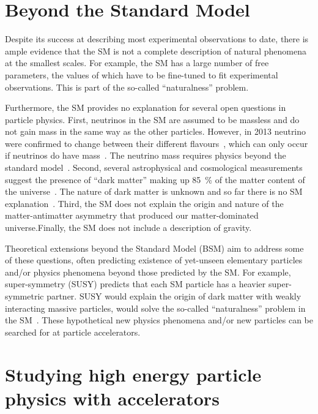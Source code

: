\section{Beyond the Standard Model}

Despite its success at describing most experimental observations to date, there is ample evidence that the SM is not a complete description of natural phenomena at the smallest scales. For example, the SM has a large number of free parameters, the values of which have to be fine-tuned to fit experimental observations. This is part of the so-called ``naturalness'' problem.

Furthermore, the SM provides no explanation for several open questions in particle physics. First, neutrinos in the SM are assumed to be massless and do not gain mass in the same way as the other particles. However, in 2013 neutrino were confirmed to change between their different flavours~\cite{aharmim_combined_2013}, which can only occur if neutrinos do have mass~\cite{pontecorvo_neutrino_1967}. The neutrino mass requires physics beyond the standard model~\cite{bilenky_massive_1987}. Second, several astrophysical and cosmological measurements suggest the presence of ``dark matter'' making up 85~\% of the matter content of the universe~\cite{young_survey_2017}. The nature of dark matter is unknown and so far there is no SM explanation~\cite{munoz_dark_2004}. Third, the SM does not explain the origin and nature of the matter-antimatter asymmetry that produced our matter-dominated universe.Finally, the SM does not include a description of gravity.

Theoretical extensions beyond the Standard Model (BSM) aim to address some of these questions, often predicting existence of yet-unseen elementary particles and/or physics phenomena beyond those predicted by the SM. For example, super-symmetry (SUSY) predicts that each SM particle has a heavier super-symmetric partner. SUSY would explain the origin of dark matter with weakly interacting massive particles, would solve the so-called ``naturalness'' problem in the SM~\cite{jungman_supersymmetric_1996}. These hypothetical new physics phenomena and/or new particles can be searched for at particle accelerators. 

\section{Studying high energy particle physics with accelerators}

